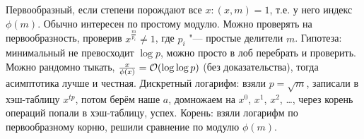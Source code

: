 \section{} %
Первообразный, если степени порождают все $x \colon (x,m)=1$, т.е. у него индекс $\phi(m)$.
Обычно интересен по простому модулю.
Можно проверять на первообразность, проверив $x^{\frac{m}{p_i}} \neq 1$, где $p_i$ "--- простые делители $m$.
Гипотеза: минимальный не превосходит $\log p$, можно просто в лоб перебрать и проверить.
Можно рандомно тыкать, $\frac{x}{\phi(x)} = \mathcal{O}(\log \log p)$ (без доказательства), тогда асимптотика лучше и честная.
Дискретный логарифм: взяли $p=\sqrt m$, записали в хэш-таблицу $x^{tp}$, потом берём наше $a$, домножаем на $x^0$, $x^1$, $x^2$, \dots,
через корень операций попали в хэш-таблицу, успех.
Корень: взяли логарифм по первообразному корню, решили сравнение по модулю $\phi(m)$.
